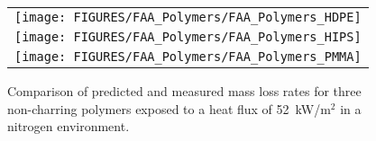 \newpage

\begin{figure}[p]
\begin{center}
\begin{tabular}{c}
\texttt{[image: FIGURES/FAA\_Polymers/FAA\_Polymers\_HDPE]} \\
\texttt{[image: FIGURES/FAA\_Polymers/FAA\_Polymers\_HIPS]} \\
\texttt{[image: FIGURES/FAA\_Polymers/FAA\_Polymers\_PMMA]} 
\end{tabular}
\end{center}
\caption[Results of FAA Polymers comparison]{Comparison of predicted and measured mass loss rates for three non-charring polymers exposed to a heat flux of 52~kW/m$^2$ in a
nitrogen environment.}
\label{FAA_Polymers}
\end{figure}

